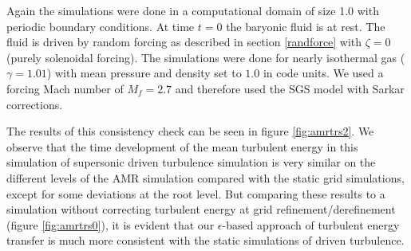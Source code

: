 Again the simulations were done in a computational domain of size 1.0 with
periodic boundary conditions. At time $t=0$ the baryonic fluid is at rest. The
fluid is driven by random forcing as described in section \ref{randforce} with
$\zeta = 0$ (purely solenoidal
forcing). The simulations were done for nearly isothermal gas
($\gamma=1.01$) with mean pressure and density set to $1.0$ in code units.
We used a forcing Mach number of $M_f=2.7$ and therefore used the SGS model
with Sarkar corrections. 


The results of this consistency check can be seen in figure \ref{fig:amrtrs2}.
We observe that the time development of the mean turbulent energy in this
simulation of supersonic driven turbulence simulation is very similar on the
different levels of the AMR simulation compared with the static grid
simulations, except for some deviations at the root level. But comparing these 
results to a simulation without correcting turbulent energy at grid
refinement/derefinement (figure \ref{fig:amrtrs0}), it is evident that our
$\epsilon$-based approach of turbulent energy transfer is much more consistent
with the static simulations of driven turbulence. 

